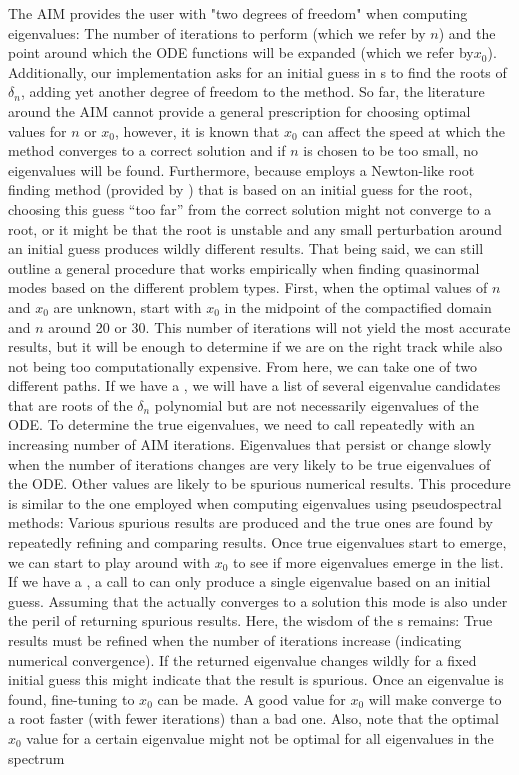 The AIM provides the user with "two degrees of freedom" when computing eigenvalues: The number of iterations to perform (which we refer by $n$) and the point around which the ODE functions will be expanded (which we refer by$x_0$). Additionally, our implementation asks for an initial guess in s to find the roots of $\delta_n$, adding yet another degree of freedom to the method. So far, the literature around the AIM cannot provide a general prescription for choosing optimal values for $n$ or $x_0$, however, it is known that $x_0$ can affect the speed at which the method converges to a correct solution and if $n$ is chosen to be too small, no eigenvalues will be found. Furthermore, because  employs a Newton-like root finding method (provided by ) that is based on an initial guess for the root, choosing this guess ``too far'' from the correct solution might not converge to a root, or it might be that the root is unstable and any small perturbation around an initial guess produces wildly different results. That being said, we can still outline a general procedure that works empirically when finding quasinormal modes based on the different problem types. First, when the optimal values of $n$ and $x_0$ are unknown, start with $x_0$ in the midpoint of the compactified domain and $n$ around 20 or 30. This number of iterations will not yield the most accurate results, but it will be enough to determine if we are on the right track while also not being too computationally expensive. From here, we can take one of two different paths. If we have a , we will have a list of several eigenvalue candidates that are roots of the $\delta_n$ polynomial but are not necessarily eigenvalues of the ODE. To determine the true eigenvalues, we need to call  repeatedly with an increasing number of AIM iterations. Eigenvalues that persist or change slowly when the number of iterations changes are very likely to be true eigenvalues of the ODE. Other values are likely to be spurious numerical results. This procedure is similar to the one employed when computing eigenvalues using pseudospectral methods: Various spurious results are produced and the true ones are found by repeatedly refining and comparing results. Once true eigenvalues start to emerge, we can start to play around with $x_0$ to see if more eigenvalues emerge in the list. If we have a , a call to  can only produce a single eigenvalue based on an initial guess. Assuming that the  actually converges to a solution this mode is also under the peril of returning spurious results. Here, the wisdom of the s remains: True results must be refined when the number of iterations increase (indicating numerical convergence). If the returned eigenvalue changes wildly for a fixed initial guess this might indicate that the result is spurious. Once an eigenvalue is found, fine-tuning to $x_0$ can be made. A good value for $x_0$ will make  converge to a root faster (with fewer iterations) than a bad one. Also, note that the optimal $x_0$ value for a certain eigenvalue might not be optimal for all eigenvalues in the spectrum 